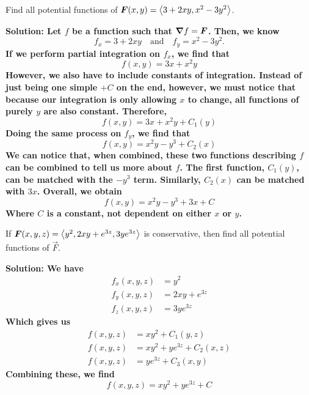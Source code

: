 \begin{example}
    Find all potential functions of $\boldsymbol{F}(x,y) = \left\langle 3+2xy, x^2-3y^2\right\rangle$. \par
    \bf{Solution:} Let $f$ be a function such that $\boldsymbol\nabla f = \boldsymbol{F}$. Then, we know
    \[ f_x = 3+2xy\quad\text{and}\quad f_y = x^2-3y^2.\]
    If we perform partial integration on $f_x$, we find that
    \[ f(x,y) = 3x+x^2y\]
    However, we also have to include constants of integration. Instead of just being one simple $+C$ on the end, however, we must notice that because our integration is only allowing $x$ to change, all functions of purely $y$ are also constant. Therefore,
    \[ f(x,y) = 3x+x^2y+C_1(y)\]
    Doing the same process on $f_y$, we find that
    \[ f(x,y) = x^2y-y^3+C_2(x)\]
    We can notice that, when combined, these two functions describing $f$ can be combined to tell us more about $f$. The first function, $C_1(y)$, can be matched with the $-y^3$ term. Similarly, $C_2(x)$ can be matched with $3x$. Overall, we obtain
    \[ f(x,y) = x^2y-y^3+3x+C\]
    Where $C$ is a constant, not dependent on either $x$ or $y$.
\end{example}
\begin{example}
    If $\boldsymbol{F}(x,y,z) = \left\langle y^2, 2xy+e^{3z}, 3ye^{3z}\right\rangle$ is conservative, then find all potential functions of $\vec F$. \par
    \bf{Solution:} We have 
    \begin{align}
        f_x(x,y,z) &= y^2 \label{151} \\
        f_y(x,y,z) &= 2xy+e^{3z} \label{152}\\
        f_z(x,y,z) &= 3ye^{3z} \label{153}
    \end{align}
    Which gives us
    \begin{align}
        f(x,y,z) &= xy^2+C_1(y,z) \\
        f(x,y,z) &= xy^2+ye^{3z} + C_2(x,z) \\
        f(x,y,z) &= ye^{3z} + C_3(x,y)
    \end{align}
    Combining these, we find
    \[ f(x,y,z) = xy^2+ye^{3z}+C\]
\end{example}
